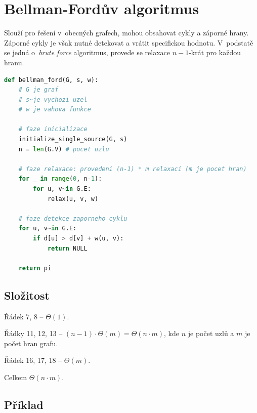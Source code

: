 
\section{Bellman-Fordův algoritmus}

Slouží pro řešení v~obecných grafech, mohou obsahovat cykly a záporné hrany. Záporné cykly je však nutné detekovat a vrátit specifickou hodnotu. V~podstatě se jedná o~\textit{brute force} algoritmus, provede se relaxace $n-1$-krát pro každou hranu.

\bigskip\noindent\begin{minipage}{\linewidth}
\begin{lstlisting}[language=Python, caption={Algoritmus Bellman-Ford. Proč $n-1$ iterací? Protože mezi libovolnými dvěma uzly v~grafu, existuje cesta o~maximálním počtu hran $n-1$.}]
def bellman_ford(G, s, w):
    # G je graf
    # s~je vychozi uzel
    # w je vahova funkce

    # faze inicializace
    initialize_single_source(G, s)
    n = len(G.V) # pocet uzlu

    # faze relaxace: provedeni (n-1) * m relaxaci (m je pocet hran)
    for _ in range(0, n-1):
        for u, v~in G.E:
            relax(u, v, w)

    # faze detekce zaporneho cyklu
    for u, v~in G.E:
        if d[u] > d[v] + w(u, v):
            return NULL

    return pi
\end{lstlisting}
\end{minipage}

\subsection{Složitost}

\begin{compactitem}
    \item Řádek 7, 8 -- $\Theta(1)$.
    \item Řádky 11, 12, 13 -- $(n-1) \cdot \Theta(m) = \Theta(n \cdot m)$, kde $n$ je počet uzlů a $m$ je počet hran grafu.
    \item Řádek 16, 17, 18 -- $\Theta(m)$.
    \item Celkem $\Theta(n \cdot m)$.
\end{compactitem}

\subsection{Příklad}

